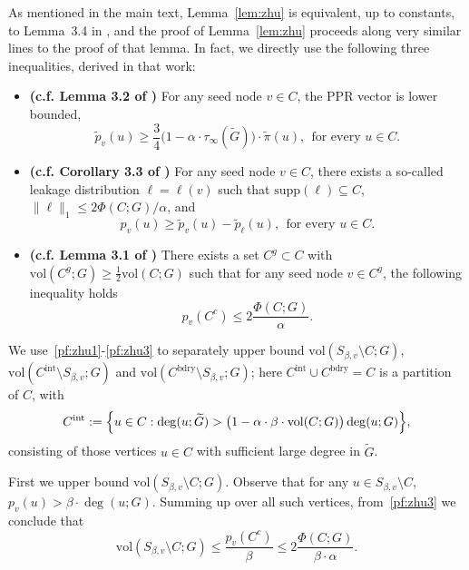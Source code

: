 \documentclass{article}
\newcommand{\vol}{\mathrm{vol}}
\newcommand{\1}{\mathbf{1}}
\newcommand{\wt}[1]{\widetilde{#1}}
\theoremstyle{definition}
\theoremstyle{remark}
\begin{document}
As mentioned in the main text, Lemma~\ref{lem:zhu} is equivalent, up to constants, to Lemma~3.4 in \cite{zhu2013}, and the proof of Lemma~\ref{lem:zhu} proceeds along very similar lines to the proof of that lemma. In fact, we directly use the following three inequalities, derived in that work:
\begin{itemize}
	\item \textbf{(c.f. Lemma 3.2 of \cite{zhu2013})} For any seed node $v \in C$, the PPR vector is lower bounded,
	\begin{equation}
	\label{pf:zhu1}
	\wt{p}_v(u) \geq \frac{3}{4}\bigl(1 - \alpha \cdot \tau_{\infty}(\wt{G})\bigr) \cdot \wt{\pi}(u),~~\textrm{for every $u \in C$.}
	\end{equation}
	\item \textbf{(c.f. Corollary 3.3 of \cite{zhu2013})} For any seed node $v \in C$, there exists a so-called leakage distribution $\ell = \ell(v)$ such that $\mathrm{supp}(\ell) \subseteq C$, $\|\ell\|_1 \leq 2\Phi(C;G)/\alpha$, and 
	\begin{equation}
	\label{pf:zhu2}
	p_v(u) \geq \wt{p}_v(u) - \wt{p}_{\ell}(u),~~\textrm{for every $u \in C$.}
	\end{equation}
	\item \textbf{(c.f. Lemma 3.1 of \cite{zhu2013})} There exists a set $C^g \subset C$ with $\vol(C^g;G) \geq \frac{1}{2}\vol(C;G)$ such that for any seed node $v \in C^g$, the following inequality holds
	\begin{equation}
	\label{pf:zhu3}
	p_v(C^c) \leq 2\frac{\Phi(C;G)}{\alpha}.
	\end{equation}
\end{itemize}
We use~\eqref{pf:zhu1}-\eqref{pf:zhu3} to separately upper bound $\vol(S_{\beta,v} \setminus C;G)$, $\vol(C^{\mathrm{int}} \setminus S_{\beta,v};G)$ and $\vol(C^{\mathrm{bdry}} \setminus S_{\beta,v};G)$; here $C^{\mathrm{int}} \cup C^{\mathrm{bdry}} = C$ is a partition of $C$, with
\begin{equation*}
C^{\mathrm{int}} := \Bigl\{u \in C: \deg(u;\wt{G}) > \bigl(1 - \alpha \cdot \beta \cdot \vol(C;G)\bigr) \deg(u;G) \Bigr\},
\end{equation*}
consisting of those vertices $u \in C$ with sufficient large degree in $\wt{G}$. 

First we upper bound $\vol(S_{\beta,v} \setminus C;G)$. Observe that for any $u \in S_{\beta,v} \setminus C$, $p_v(u) > \beta \cdot \deg(u;G)$. Summing up over all such vertices, from~\eqref{pf:zhu3} we conclude that
\begin{equation}
\label{pf:zhu3.5}
\vol(S_{\beta,v} \setminus C; G) \leq \frac{p_v(C^c)}{\beta} \leq 2\frac{\Phi(C;G)}{\beta \cdot \alpha}.
\end{equation} 
\end{document}
